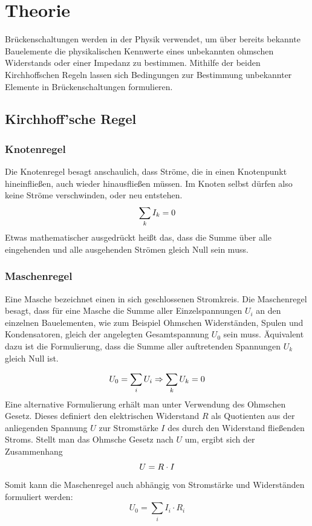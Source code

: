\section{Theorie}
\label{sec:Theorie}
Brückenschaltungen werden in der Physik verwendet, um über bereits bekannte Bauelemente die
physikalischen Kennwerte eines unbekannten ohmschen Widerstands oder einer Impedanz zu bestimmen.
Mithilfe der beiden Kirchhoffschen Regeln lassen sich Bedingungen zur Bestimmung unbekannter Elemente in
Brückenschaltungen formulieren.
\subsection{Kirchhoff'sche Regel}

\subsubsection{Knotenregel}
Die Knotenregel besagt anschaulich, dass Ströme, die in einen Knotenpunkt
hineinfließen, auch wieder hinausfließen müssen. Im Knoten selbst dürfen also keine Ströme verschwinden,
oder neu entstehen.
\begin{equation}
  \centering
  \label{eqn:knotenregel}
\sum_{k}{I_k}=0
\end{equation}
Etwas mathematischer ausgedrückt heißt das, dass die Summe über alle eingehenden
und alle ausgehenden Strömen gleich Null sein muss.

\subsubsection{Maschenregel}
Eine Masche bezeichnet einen in sich geschlossenen Stromkreis.
Die Maschenregel besagt, dass für eine Masche die Summe aller Einzelspannungen $U_i$
an den einzelnen Bauelementen, wie zum Beispiel Ohmschen Widerständen, Spulen und Kondensatoren,
gleich der angelegten Gesamtspannung $U_0$ sein muss. Äquivalent dazu ist die Formulierung, dass die Summe aller auftretenden Spannungen $U_k$ gleich Null ist.

\begin{equation}
  \label{eqn:maschenregel}
  \centering
U_0=\sum_{i}{U_i} \Rightarrow \sum_{k}{U_k}=0
\end{equation}
 Eine alternative Formulierung erhält man unter Verwendung des Ohmschen Gesetz. Dieses definiert den elektrischen Widerstand $R$
 als Quotienten aus der anliegenden Spannung $U$ zur Stromstärke $I$ des durch den Widerstand fließenden Stroms.
 Stellt man das Ohmsche Gesetz nach $U$ um, ergibt sich der Zusammenhang
\begin{equation}
   \centering
   U=R \cdot I
 \end{equation}
 Somit kann die Maschenregel auch abhängig von Stromstärke und Widerständen formuliert werden:
 \begin{equation}
   U_0=\sum_{i}{I_i \cdot R_i}
\end{equation}


